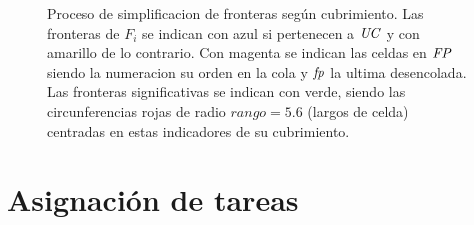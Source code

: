 \begin{figure}[H]

  \caption[Proceso de simplificacion de fronteras según cubrimiento.]{Proceso
    de simplificacion de fronteras según cubrimiento.  Las fronteras de
    $F_i$ se indican con azul si pertenecen a $\mathit{UC}$ y con amarillo de lo
    contrario. Con magenta se indican las celdas en $\mathit{FP}$ siendo la
  numeracion su orden en la cola y $\mathit{fp}$ la ultima desencolada. Las fronteras significativas se indican con
verde, siendo las circunferencias rojas de radio $rango=5.6$ (largos de celda) centradas en estas indicadores de su cubrimiento.}\label{fig:ejemploFSCub}

\end{figure}


\section{Asignación de tareas}

